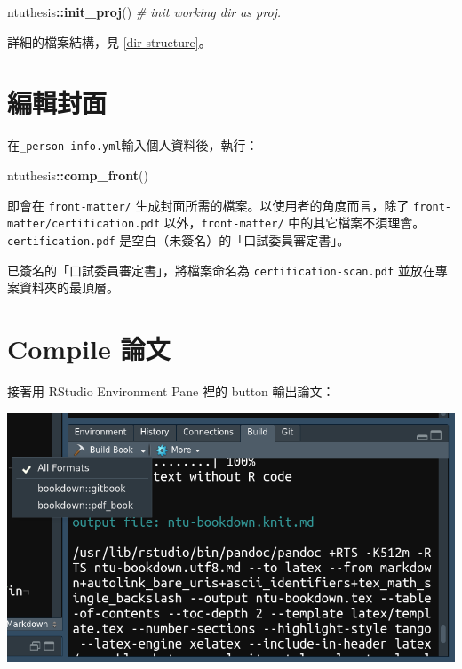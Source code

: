 \documentclass[oneside]{book}
\newenvironment{Shaded}{\begin{snugshade}}{\end{snugshade}}
\newcommand{\KeywordTok}[1]{\textcolor[rgb]{0.13,0.29,0.53}{\textbf{#1}}}
\newcommand{\CommentTok}[1]{\textcolor[rgb]{0.56,0.35,0.01}{\textit{#1}}}
\newcommand{\OperatorTok}[1]{\textcolor[rgb]{0.81,0.36,0.00}{\textbf{#1}}}
\newcommand{\NormalTok}[1]{#1}
\theoremstyle{definition}
\theoremstyle{definition}
\theoremstyle{definition}
\theoremstyle{remark}
\begin{document}
\begin{Shaded}
\begin{Highlighting}[]
\NormalTok{ntuthesis}\OperatorTok{::}\KeywordTok{init_proj}\NormalTok{()  }\CommentTok{# init working dir as proj.}
\end{Highlighting}
\end{Shaded}

詳細的檔案結構，見 \ref{dir-structure}。

\section{編輯封面}\label{edit-front-matter}

在\texttt{\_person-info.yml}輸入個人資料後，執行：

\begin{Shaded}
\begin{Highlighting}[]
\NormalTok{ntuthesis}\OperatorTok{::}\KeywordTok{comp_front}\NormalTok{()}
\end{Highlighting}
\end{Shaded}

即會在 \texttt{front-matter/}
生成封面所需的檔案。以使用者的角度而言，除了
\texttt{front-matter/certification.pdf} 以外，\texttt{front-matter/}
中的其它檔案不須理會。\texttt{certification.pdf}
是空白（未簽名）的「口試委員審定書」。

已簽名的「口試委員審定書」，將檔案命名為 \texttt{certification-scan.pdf}
並放在專案資料夾的最頂層。

\section{Compile 論文}\label{compile-thesis}

接著用 RStudio Environment Pane 裡的 button 輸出論文：

\begin{center}\includegraphics[width=1\linewidth]{figs/build-button} \end{center}
\end{document}
